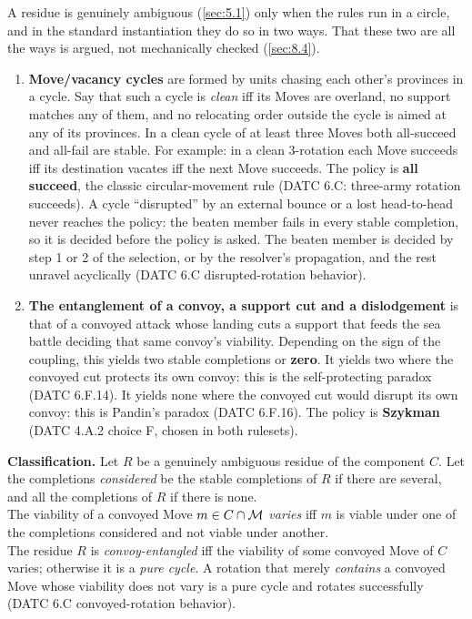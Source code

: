 \documentclass[12pt,a4paper]{article}
\begin{document}
A residue is genuinely ambiguous (\cref{sec:5.1}) only when the rules run in a circle, and in the standard instantiation they do so in two ways.
That these two are all the ways is argued, not mechanically checked (\cref{sec:8.4}).
\begin{enumerate}
\item \textbf{Move/vacancy cycles} are formed by units chasing each other's provinces in a cycle.
Say that such a cycle is \emph{clean} iff its Moves are overland, no support matches any of them, and no relocating order outside the cycle is aimed at any of its provinces.
In a clean cycle of at least three Moves both all-succeed and all-fail are stable.
For example: in a clean 3-rotation each Move succeeds iff its destination vacates iff the next Move succeeds.
The policy is \textbf{all succeed}, the classic circular-movement rule (DATC 6.C: three-army rotation succeeds).
A cycle ``disrupted'' by an external bounce or a lost head-to-head never reaches the policy: the beaten member fails in every stable completion, so it is decided before the policy is asked.
The beaten member is decided by step 1 or 2 of the selection, or by the resolver's propagation, and the rest unravel acyclically (DATC 6.C disrupted-rotation behavior).
\item \textbf{The entanglement of a convoy, a support cut and a dislodgement} is that of a convoyed attack whose landing cuts a support that feeds the sea battle deciding that same convoy's viability.
Depending on the sign of the coupling, this yields two stable completions or \textbf{zero}.
It yields two where the convoyed cut protects its own convoy: this is the self-protecting paradox (DATC 6.F.14).
It yields none where the convoyed cut would disrupt its own convoy: this is Pandin's paradox (DATC 6.F.16).
The policy is \textbf{Szykman} (DATC 4.A.2 choice F, chosen in both rulesets).
\end{enumerate}

\textbf{Classification.}
Let $R$ be a genuinely ambiguous residue of the component $C$.
Let the completions \emph{considered} be the stable completions of $R$ if there are several, and all the completions of $R$ if there is none.\\
The viability of a convoyed Move $m \in C \cap \mathcal{M}$ \emph{varies} iff $m$ is viable under one of the completions considered and not viable under another.\\
The residue $R$ is \emph{convoy-entangled} iff the viability of some convoyed Move of $C$ varies; otherwise it is a \emph{pure cycle}.
A rotation that merely \emph{contains} a convoyed Move whose viability does not vary is a pure cycle and rotates successfully (DATC 6.C convoyed-rotation behavior).
\end{document}
